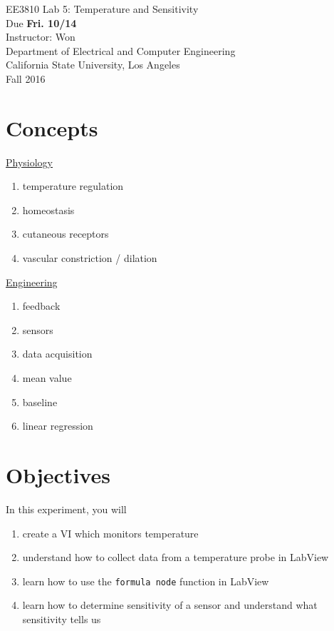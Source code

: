 \documentclass[12pt,oneside]{article}
\begin{document}
\begin{center}
\Large{EE3810 Lab 5: Temperature and Sensitivity\\ Due \textbf{Fri. 10/14}\\}
\large{Instructor: Won\\
Department of Electrical and Computer Engineering\\
California State University, Los Angeles\\
Fall 2016}
\end{center}

\section{Concepts}
\begin{multicols}{2}
\underline{Physiology}
\begin{enumerate}
\item temperature regulation
\item homeostasis
\item cutaneous receptors
\item vascular constriction / dilation
\end{enumerate}

\columnbreak

\underline{Engineering}
\begin{enumerate}
\item feedback
\item sensors
\item data acquisition
\item mean value
\item baseline
\item linear regression
\end{enumerate}

\end{multicols}

\section{Objectives} 
In this experiment, you will
\begin{enumerate}
\item create a VI which monitors temperature
\item understand how to collect data from a temperature probe in LabView
\item learn how to use the {\tt formula node} function in LabView
\item learn how to determine sensitivity of a sensor and understand what sensitivity tells us
\end{enumerate}
\end{document}
